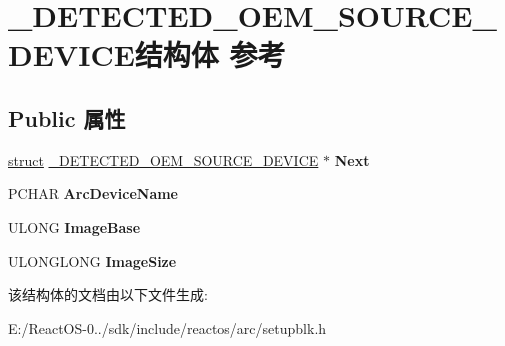 \hypertarget{struct___d_e_t_e_c_t_e_d___o_e_m___s_o_u_r_c_e___d_e_v_i_c_e}{}\section{\+\_\+\+D\+E\+T\+E\+C\+T\+E\+D\+\_\+\+O\+E\+M\+\_\+\+S\+O\+U\+R\+C\+E\+\_\+\+D\+E\+V\+I\+C\+E结构体 参考}
\label{struct___d_e_t_e_c_t_e_d___o_e_m___s_o_u_r_c_e___d_e_v_i_c_e}
\subsection*{Public 属性}
\begin{DoxyCompactItemize}
\item 
\mbox{\label{struct___d_e_t_e_c_t_e_d___o_e_m___s_o_u_r_c_e___d_e_v_i_c_e_a31927181c35c8fd3821239e823898489}} 
\hyperlink{interfacestruct}{struct} \hyperlink{struct___d_e_t_e_c_t_e_d___o_e_m___s_o_u_r_c_e___d_e_v_i_c_e}{\+\_\+\+D\+E\+T\+E\+C\+T\+E\+D\+\_\+\+O\+E\+M\+\_\+\+S\+O\+U\+R\+C\+E\+\_\+\+D\+E\+V\+I\+CE} $\ast$ {\bfseries Next}
\item 
\mbox{\label{struct___d_e_t_e_c_t_e_d___o_e_m___s_o_u_r_c_e___d_e_v_i_c_e_a775573a01f70c83db7de096a538afe8e}} 
P\+C\+H\+AR {\bfseries Arc\+Device\+Name}
\item 
\mbox{\label{struct___d_e_t_e_c_t_e_d___o_e_m___s_o_u_r_c_e___d_e_v_i_c_e_af9f33e9a12ff891da14de60f30bd2aef}} 
U\+L\+O\+NG {\bfseries Image\+Base}
\item 
\mbox{\label{struct___d_e_t_e_c_t_e_d___o_e_m___s_o_u_r_c_e___d_e_v_i_c_e_a69fabb348389442bf80e39b5e84893b3}} 
U\+L\+O\+N\+G\+L\+O\+NG {\bfseries Image\+Size}
\end{DoxyCompactItemize}


该结构体的文档由以下文件生成\+:\begin{DoxyCompactItemize}
\item 
E\+:/\+React\+O\+S-\/0../sdk/include/reactos/arc/setupblk.\+h\end{DoxyCompactItemize}
